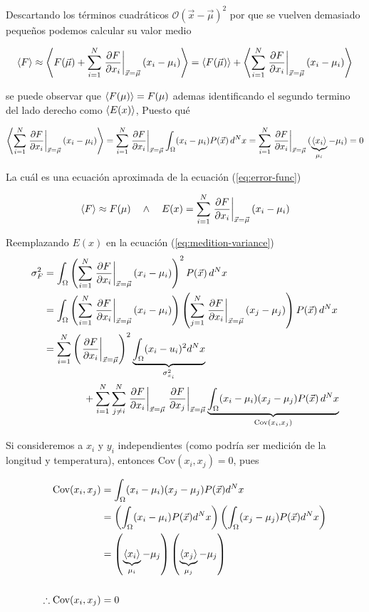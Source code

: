 Descartando los términos cuadráticos $\mathcal{O}(\vec{x}-\vec\mu)^2$
por que se vuelven demasiado pequeños podemos calcular su valor medio

\begin{equation}
  \left\langle F \right\rangle \approx \left\langle F(\vec\mu) + \sum_{i = 1}^N \left.\frac{\partial F}{\partial x_i}\right|_{\vec x = \vec\mu} (x_i - \mu_i) \right\rangle
  = \left\langle F(\vec\mu) \right\rangle + \left\langle \sum_{i = 1}^N \left.\frac{\partial F}{\partial x_i}\right|_{\vec x = \vec\mu} (x_i - \mu_i) \right\rangle
  \label{eq:F-mean-value}
\end{equation}

se puede observar que $\left\langle F(\mu) \right\rangle = F(\mu)$ ademas identificando el segundo
termino del lado derecho como $\left\langle E(x) \right\rangle$, Puesto qué

\begin{equation*}
  \left\langle \sum_{i = 1}^N \left.\frac{\partial F}{\partial x_i}\right|_{\vec x = \vec\mu} (x_i - \mu_i) \right\rangle
  = \sum_{i = 1}^N \left.\frac{\partial F}{\partial x_i}\right|_{\vec x = \vec\mu} \int_\Omega (x_i - \mu_i)P(\vec x)\, d^N x
  = \sum_{i = 1}^N \left.\frac{\partial F}{\partial x_i}\right|_{\vec x = \vec\mu} (\underbrace{\left\langle x_i \right\rangle}_{\mu_i} - \mu_i)
  = 0
\end{equation*}

La cuál es una ecuación aproximada de la ecuación (\ref{eq:error-func})

\begin{equation}
  \left\langle F \right\rangle \approx F(\mu)\quad \wedge \quad E(x) = \sum_{i = 1}^N
  \left.\frac{\partial F}{\partial x_i}\right|_{\vec x = \vec\mu} (x_i - \mu_i)
  \label{eq:F-mean}
\end{equation}

Reemplazando $E(x)$ en la ecuación (\ref{eq:medition-variance})
\begin{align*}
  \sigma_F^2 &= \int_\Omega \left(
    \sum_{i = 1}^N \left.\frac{\partial F}{\partial x_i}\right|_{\vec x = \vec\mu} (x_i - \mu_i)
  \right)^2 P(\vec x)\, d^Nx\\
  &= \int_\Omega
  \left(
    \sum_{i = 1}^N \left.\frac{\partial F}{\partial x_i}\right|_{\vec x = \vec\mu} (x_i - \mu_i)
  \right)
  \left(
    \sum_{j = 1}^N \left.\frac{\partial F}{\partial x_i}\right|_{\vec x = \vec\mu} (x_j - \mu_j)
  \right)P(\vec x)\,d^Nx\\
  &=\sum_{i=1}^N\left(\left.\frac{\partial F}{\partial x_i}\right|_{\vec x = \vec\mu}\right)^2
  \underbrace{\int_\Omega(x_i-u_i)^2d^Nx}_{\sigma^2_{x_i}}\\
  &\qquad\qquad+\sum_{i=1}^N \sum_{j\neq i}^N\left.\frac{\partial F}{\partial x_i}\right|_{\vec x = \vec\mu}\left.\frac{\partial F}{\partial x_j}\right|_{\vec x = \vec\mu}
  \underbrace{
    \int_\Omega(x_i -\mu_i)(x_j - \mu_j)P(\vec x)\, d^Nx
  }_{\text{Cov}(x_i, x_j)}
\end{align*}

Si consideremos a $x_i$ y $y_i$ independientes
(como podría ser medición de la longitud y temperatura), entonces
${\text{Cov}(x_i, x_j)} = 0$, pues

\begin{align*}
  \text{Cov}(x_i, x_j) &= \int_\Omega (x_i - \mu_i)(x_j - \mu_j)
  P(\vec x) d^Nx \\
  &= \left(\int_\Omega (x_i - \mu_i)P(\vec x) d^Nx\right)
  \left(\int_\Omega (x_j - \mu_j)P(\vec x) d^Nx\right)\\
  &= \left(\underbrace{\left\langle x_i \right\rangle}_{\mu_i} - \mu_j\right)
  \left(\underbrace{\left\langle x_j \right\rangle}_{\mu_j} - \mu_j\right)\\
  \\
  \therefore \text{Cov}(x_i, x_j) &= 0
\end{align*}

